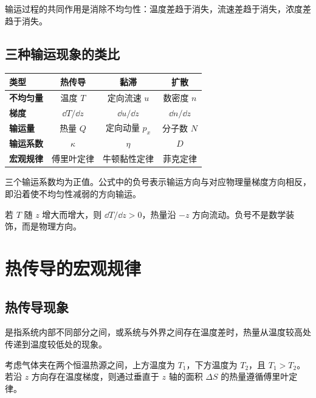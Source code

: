 \begin{KeyBox}[输运过程的一句话理解]
输运过程的共同作用是消除不均匀性：温度差趋于消失，流速差趋于消失，浓度差趋于消失。
\end{KeyBox}

\subsection{三种输运现象的类比}

\begin{FormulaBox}[三种输运过程的统一结构]
\begin{tabularx}{\textwidth}{@{}>{\bfseries}lCCC@{}}
\toprule
类型 & 热传导 & 黏滞 & 扩散\\
\midrule
不均匀量 & 温度 \(T\) & 定向流速 \(u\) & 数密度 \(n\)\\
梯度 & \(\dd T/\dd z\) & \(\dd u/\dd z\) & \(\dd n/\dd z\)\\
输运量 & 热量 \(Q\) & 定向动量 \(p_x\) & 分子数 \(N\)\\
输运系数 & \(\kappa\) & \(\eta\) & \(D\)\\
宏观规律 & 傅里叶定律 & 牛顿黏性定律 & 菲克定律\\
\bottomrule
\end{tabularx}
\end{FormulaBox}

三个输运系数均为正值。公式中的负号表示输运方向与对应物理量梯度方向相反，即沿着使不均匀性减弱的方向输运。

\begin{WarnBox}
若 \(T\) 随 \(z\) 增大而增大，则 \(\dd T/\dd z>0\)，热量沿 \(-z\) 方向流动。负号不是数学装饰，而是物理方向。
\end{WarnBox}

\section{热传导的宏观规律}

\subsection{热传导现象}

是指系统内部不同部分之间，或系统与外界之间存在温度差时，热量从温度较高处传递到温度较低处的现象。

考虑气体夹在两个恒温热源之间，上方温度为 \(T_1\)，下方温度为 \(T_2\)，且 \(T_1>T_2\)。若沿 \(z\) 方向存在温度梯度，则通过垂直于 \(z\) 轴的面积 \(\Delta S\) 的热量遵循傅里叶定律。


